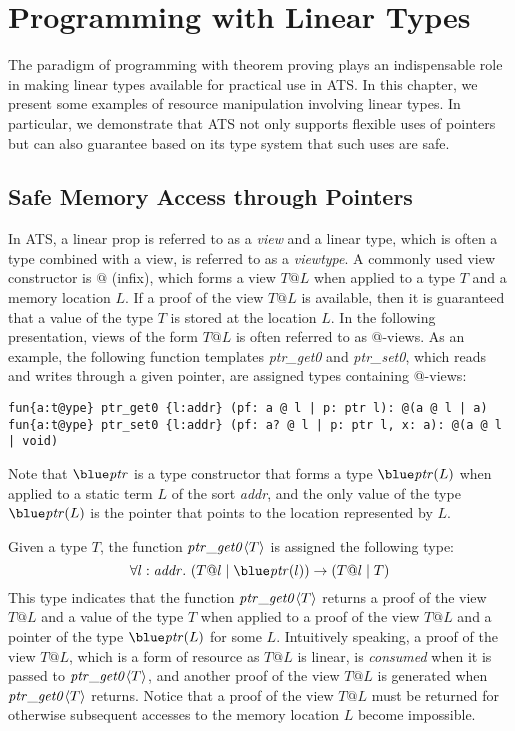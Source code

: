 \chapter{Programming with Linear Types}

The paradigm of programming with theorem proving plays an indispensable
role in making linear types available for practical use in ATS.  In this
chapter, we present some examples of resource manipulation involving linear
types. In particular, we demonstrate that ATS not only supports flexible
uses of pointers but can also guarantee based on its type system that such
uses are safe.

\section{Safe Memory Access through Pointers}
In ATS, a linear prop is referred to as a {\it view} and a linear type,
which is often a type combined with a view, is referred to as a {\it
viewtype}. A commonly used view constructor is $@$ (infix), which forms a
view $T@L$ when applied to a type $T$ and a memory location $L$. If a proof
of the view $T@L$ is available, then it is guaranteed that a value of the
type $T$ is stored at the location $L$. In the following presentation,
views of the form $T@L$ is often referred to as @-views.  As an example,
the following function templates {\it ptr\_get0} and {\it ptr\_set0}, which reads
and writes through a given pointer, are assigned types containing @-views:
\begin{verbatim}
fun{a:t@ype} ptr_get0 {l:addr} (pf: a @ l | p: ptr l): @(a @ l | a)
fun{a:t@ype} ptr_set0 {l:addr} (pf: a? @ l | p: ptr l, x: a): @(a @ l | void)
\end{verbatim}
Note that $\tptr$ is a type constructor that forms a type $\tptr(L)$ when
applied to a static term $L$ of the sort {\it addr}, and the only value of
the type $\tptr(L)$ is the pointer that points to the location represented
by $L$.

Given a type $T$, the function ${\it ptr\_get0}\langle
T\rangle$ is assigned the following type:
\[\forall l:\saddr.~(T @ l \mid \tptr (l))\timp(T@l \mid T)\]
This type indicates that the function ${\it ptr\_get0}\langle T\rangle$
returns a proof of the view $T@L$ and a value of the type $T$ when applied
to a proof of the view $T@L$ and a pointer of the type $\tptr(L)$ for some
$L$. Intuitively speaking, a proof of the view $T@L$, which is a form of
resource as $T@L$ is linear, is {\it consumed} when it is passed to ${\it
ptr\_get0}\langle T\rangle$, and another proof of the view $T@L$ is
generated when ${\it ptr\_get0}\langle T\rangle$ returns. Notice that a
proof of the view $T@L$ must be returned for otherwise subsequent accesses
to the memory location $L$ become impossible.

